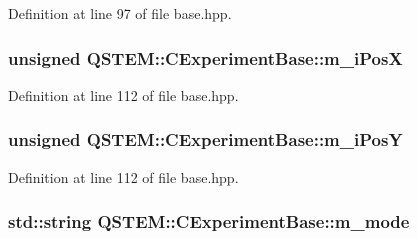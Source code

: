 Definition at line 97 of file base.\-hpp.

\hypertarget{class_q_s_t_e_m_1_1_c_experiment_base_a481e0f7bf50b4eaedf85c8243fe899a2}{
\subsubsection[{m\-\_\-i\-Pos\-X}]{\setlength{\rightskip}{0pt plus 5cm}unsigned Q\-S\-T\-E\-M\-::\-C\-Experiment\-Base\-::m\-\_\-i\-Pos\-X\hspace{0.3cm}{\ttfamily [protected]}}}\label{class_q_s_t_e_m_1_1_c_experiment_base_a481e0f7bf50b4eaedf85c8243fe899a2}


Definition at line 112 of file base.\-hpp.

\hypertarget{class_q_s_t_e_m_1_1_c_experiment_base_a9706555baa2f1dd8ade1c014b027f2be}{
\subsubsection[{m\-\_\-i\-Pos\-Y}]{\setlength{\rightskip}{0pt plus 5cm}unsigned Q\-S\-T\-E\-M\-::\-C\-Experiment\-Base\-::m\-\_\-i\-Pos\-Y\hspace{0.3cm}{\ttfamily [protected]}}}\label{class_q_s_t_e_m_1_1_c_experiment_base_a9706555baa2f1dd8ade1c014b027f2be}


Definition at line 112 of file base.\-hpp.

\hypertarget{class_q_s_t_e_m_1_1_c_experiment_base_adae1b493005c072aaf863c8baab0d545}{
\subsubsection[{m\-\_\-mode}]{\setlength{\rightskip}{0pt plus 5cm}std\-::string Q\-S\-T\-E\-M\-::\-C\-Experiment\-Base\-::m\-\_\-mode\hspace{0.3cm}{\ttfamily [protected]}}}\label{class_q_s_t_e_m_1_1_c_experiment_base_adae1b493005c072aaf863c8baab0d545}


